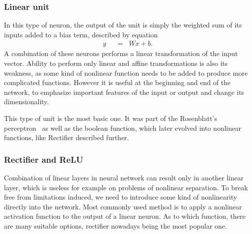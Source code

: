 \subsubsection{Linear unit}
In this type of neuron, the output of the unit is simply the weighted sum of its inputs added to a bias term, described by equation
\begin{align}
y \hspace{7pt}&=\hspace{7pt} Wx + b. \label{eq:lin}
\end{align}
A combination of these neurons performs a linear transformation of the input vector. Ability to perform only linear and affine transformations is also its weakness, as some kind of nonlinear function needs to be added to produce more complicated functions. However it is useful at the beginning and end of the network, to emphasize important features of the input or output and change its dimensionality.

This type of unit is the most basic one. It was part of the Rosenblatt's perceptron~\cite{rosenblatt58a} as well as the boolean function, which later evolved into nonlinear functions, like Rectifier described further.

\subsubsection{Rectifier and ReLU}

Combination of linear layers in neural network can result only in another linear layer, which is useless for example on problems of nonlinear separation. To break free from limitations induced, we need to introduce some kind of nonlinearity directly into the network. Most commonly used method is to apply a nonlinear activation function to the output of a linear neuron. As to which function, there are many suitable options, rectifier nowadays being the most popular one.

